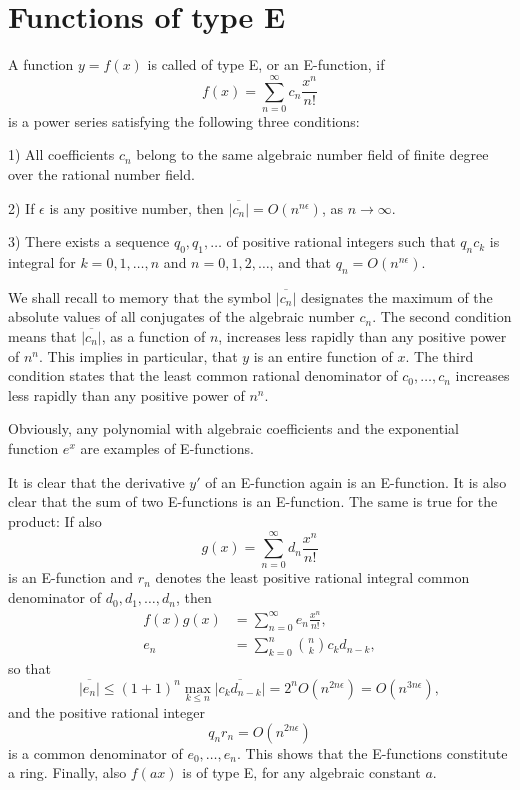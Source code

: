 \section{Functions of type E}

A function $y = f(x)$ is called of type E, or an E-function, if
\[f(x) = \sum_{n=0}^{\infty} c_n \frac{x^n}{n!}\]
is a power series satisfying the following three conditions:

1) All coefficients $c_n$ belong to the same algebraic number field of finite degree over the rational number field.

2) If $\epsilon$ is any positive number, then $\overline{|c_n|} = O(n^{n\epsilon})$, as $n \to \infty$.

3) There exists a sequence $q_0, q_1, \ldots$ of positive rational integers such that $q_n c_k$ is integral for $k = 0, 1, \ldots, n$ and $n = 0, 1, 2, \ldots$, and that $q_n = O(n^{n\epsilon})$.

We shall recall to memory that the symbol $\overline{|c_n|}$ designates the maximum of the absolute values of all conjugates of the algebraic number $c_n$. The second condition means that $\overline{|c_n|}$, as a function of $n$, increases less rapidly than any positive power of $n^n$. This implies in particular, that $y$ is an entire function of $x$. The third condition states that the least common rational denominator of $c_0, \ldots, c_n$ increases less rapidly than any positive power of $n^n$.

Obviously, any polynomial with algebraic coefficients and the exponential function $e^x$ are examples of E-functions.

It is clear that the derivative $y'$ of an E-function again is an E-function. It is also clear that the sum of two E-functions is an E-function. The same is true for the product: If also
\[g(x) = \sum_{n=0}^{\infty} d_n \frac{x^n}{n!}\]
is an E-function and $r_n$ denotes the least positive rational integral common denominator of $d_0, d_1, \ldots, d_n$, then
\[
\begin{split} f(x)g(x) &= \sum_{n=0}^{\infty} e_n \frac{x^n}{n!}, \\ e_n &= \sum_{k=0}^{n} \binom{n}{k} c_k d_{n-k}, \end{split}
\]
so that
\[\overline{|e_n|} \le (1+1)^n \max_{k \le n} \overline{|c_k d_{n-k}|} = 2^n O(n^{2n\epsilon}) = O(n^{3n\epsilon}),\]
and the positive rational integer
\[q_n r_n = O(n^{2n\epsilon})\]
is a common denominator of $e_0, \ldots, e_n$. This shows that the E-functions constitute a ring. Finally, also $f(ax)$ is of type E, for any algebraic constant $a$.

